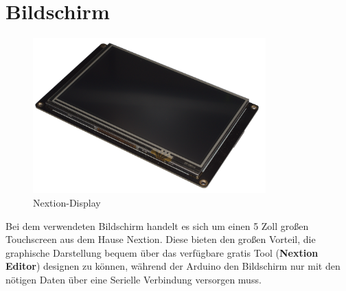 \section{Bildschirm}
\begin{figure}[h]
    \includegraphics[width=0.8\textwidth]{Fotos/Nextion_Display.png}
    \caption{Nextion-Display}
\end{figure}
Bei dem verwendeten Bildschirm handelt es sich um einen 5 Zoll großen Touchscreen aus dem Hause Nextion.
Diese bieten den großen Vorteil, die graphische Darstellung bequem über das verfügbare gratis Tool (\textbf{Nextion Editor}) designen zu können, während der Arduino den Bildschirm nur mit den nötigen Daten über eine Serielle Verbindung versorgen muss. 

